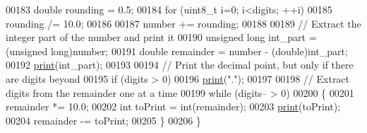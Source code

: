 \begin{DoxyCode}
00183   \textcolor{keywordtype}{double} rounding = 0.5;
00184   \textcolor{keywordflow}{for} (uint8\_t i=0; i<digits; ++i)
00185     rounding /= 10.0;
00186   
00187   number += rounding;
00188 
00189   \textcolor{comment}{// Extract the integer part of the number and print it}
00190   \textcolor{keywordtype}{unsigned} \textcolor{keywordtype}{long} int\_part = (\textcolor{keywordtype}{unsigned} long)number;
00191   \textcolor{keywordtype}{double} remainder = number - (double)int\_part;
00192   \hyperlink{class_print_aa7b0a6dc63e3d27effd8459e3d443b83}{print}(int\_part);
00193 
00194   \textcolor{comment}{// Print the decimal point, but only if there are digits beyond}
00195   \textcolor{keywordflow}{if} (digits > 0)
00196     \hyperlink{class_print_aa7b0a6dc63e3d27effd8459e3d443b83}{print}(\textcolor{stringliteral}{"."}); 
00197 
00198   \textcolor{comment}{// Extract digits from the remainder one at a time}
00199   \textcolor{keywordflow}{while} (digits-- > 0)
00200   \{
00201     remainder *= 10.0;
00202     \textcolor{keywordtype}{int} toPrint = int(remainder);
00203     \hyperlink{class_print_aa7b0a6dc63e3d27effd8459e3d443b83}{print}(toPrint);
00204     remainder -= toPrint; 
00205   \} 
00206 \}
\end{DoxyCode}
